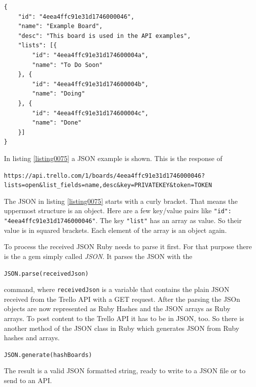 \begin{lstlisting}[aboveskip=1\baselineskip, caption=JSON example., label=listing0075]
{
    "id": "4eea4ffc91e31d1746000046",
    "name": "Example Board",
    "desc": "This board is used in the API examples",
    "lists": [{
        "id": "4eea4ffc91e31d174600004a",
        "name": "To Do Soon"
    }, {
        "id": "4eea4ffc91e31d174600004b",
        "name": "Doing"
    }, {
        "id": "4eea4ffc91e31d174600004c",
        "name": "Done"
    }]
}
\end{lstlisting}

In listing \ref{listing0075} a JSON example is shown. This is the response of

\begin{center}
\texttt{https://api.trello.com/1/boards/4eea4ffc91e31d1746000046? lists=open\&list\_fields=name,desc\&key=PRIVATEKEY\&token=TOKEN}
\end{center}

The JSON in listing \ref{listing0075} starts with a curly bracket. That means the uppermost structure is an object. Here are a few key/value pairs like \texttt{"id": "4eea4ffc91e31d1746000046"}. The key \texttt{"list"} has an array as value. So their value is in squared brackets. Each element of the array is an object again.

To process the received JSON Ruby needs to parse it first. For that purpose there is the a gem simply called \emph{JSON}. It parses the JSON with the 

\begin{center}
\lstinline{JSON.parse(receivedJson)} 
\end{center}
command, where \lstinline{receivedJson} is a variable that contains the plain JSON received from the Trello API with a GET request. After the parsing the JSOn objects are now represented as Ruby Hashes and the JSON arrays as Ruby arrays. To post content to the Trello API it has to be in JSON, too. So there is another method of the JSON class in Ruby which generates JSON from Ruby hashes and arrays. 

\begin{center}
\lstinline{JSON.generate(hashBoards)} 
\end{center}

The result is a valid JSON formatted string, ready to write to a JSON file or to send to an API.